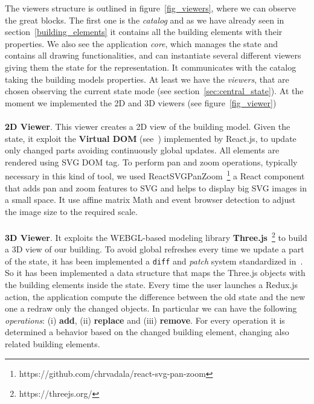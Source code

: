 The viewers structure is outlined in figure~\ref{fig_viewers}, where we can observe the great blocks. The first one is the \textit{catalog} and as we have already seen in section~\ref{building_elements} it contains all the building elements with their properties. We also see the application \textit{core}, which manages the state and contains all drawing functionalities, and can instantiate several different viewers giving them the state for the representation. It communicates with the catalog taking the building models properties. At least we have the \textit{viewers}, that are chosen observing the current state mode (see section~\ref{sec:central_state}). At the moment we implemented the 2D and 3D viewers (see figure~\ref{fig_viewer})\\\\
\textbf{2D Viewer}. This viewer creates a 2D view of the building model. Given the state, it exploit the \textbf{Virtual DOM} (see~\cite{vdom}) implemented by React.js, to update only changed parts avoiding continuously global updates. All elements are rendered using SVG DOM tag. To perform pan and zoom operations, typically necessary in this kind of tool, we used ReactSVGPanZoom~\footnote{https://github.com/chrvadala/react-svg-pan-zoom} a React component that adds pan and zoom features to SVG and helps to display big SVG images in a small space. It use affine matrix Math and event browser detection to adjust the image size to the required scale.\\\\
\textbf{3D Viewer}. It exploits the WEBGL-based modeling library \textbf{Three.js}~\footnote{https://threejs.org/} to build a 3D view of our building. To avoid global refreshes every time we update a part of the state, it has been implemented a \texttt{diff} and \textit{patch} system standardized in~\cite{rfc6902}. So it has been implemented a data structure that maps the Three.js objects with the building elements inside the state. Every time the user launches a Redux.js action, the application compute the difference between the old state and the new one a redraw only the changed objects. In particular we can have the following \textit{operations}: (i) \textbf{add}, (ii) \textbf{replace} and (iii) \textbf{remove}. For every operation it is determined a behavior based on the changed building element, changing also related building elements.

